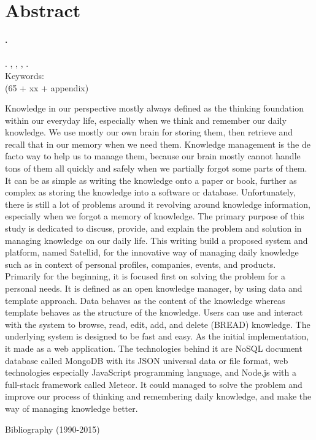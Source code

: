 
\begingroup
\let\clearpage\relax
\let\cleardoublepage\relax

\label{chap:abstract}
\chapter{Abstract}

\textbf{\myName.} \myNPM \\
\textbf{\myTitle} \\
\textbf{\myThesisType}. \myDepartmentLong, \myFacultyLong, \myUni, \myYear. \\
Keywords: \myKeywords \\
(65 + xx + appendix)

\hfill

\singlespacing

Knowledge in our perspective mostly always defined as the thinking foundation within our everyday life,
especially when we think and remember our daily knowledge.
We use mostly our own brain for storing them, then retrieve and recall that in our memory when we need them.
Knowledge management is the de facto way to help us to manage them, because our brain mostly cannot handle tons of them all quickly and safely when we partially forgot some parts of them.
It can be as simple as writing the knowledge onto a paper or book, further as complex as storing the knowledge into a software or database.
Unfortunately, there is still a lot of problems around it revolving around knowledge information, especially when we forgot a memory of knowledge.
The primary purpose of this study is dedicated to discuss, provide, and explain the problem and solution in managing knowledge on our daily life.
This writing build a proposed system and platform, named Satellid, for the innovative way of managing daily knowledge
such as in context of personal profiles, companies, events, and products.
Primarily for the beginning, it is focused first on solving the problem for a personal needs.
It is defined as an open knowledge manager, by using data and template approach.
Data behaves as the content of the knowledge whereas template behaves as the structure of the knowledge.
Users can use and interact with the system to browse, read, edit, add, and delete (BREAD) knowledge.
The underlying system is designed to be fast and easy.
As the initial implementation, it made as a web application.
The technologies behind it are NoSQL document database called MongoDB with its JSON universal data or file format, web technologies especially JavaScript programming language, and Node.js with a full-stack framework called Meteor.
It could managed to solve the problem and improve our process of thinking and remembering daily knowledge, and make the way of managing knowledge better.

\onehalfspacing

\hfill


\noindent Bibliography (1990-2015)



\endgroup

\vfill
